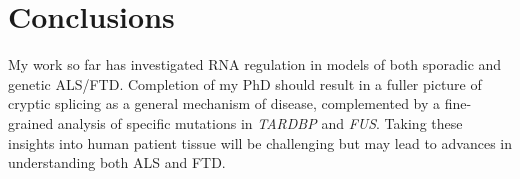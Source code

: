 \section{Conclusions}
My work so far has investigated RNA regulation in models of both sporadic and genetic ALS/FTD. Completion of my PhD should result in a fuller picture of cryptic splicing as a general mechanism of disease, complemented by a fine-grained analysis of specific mutations in \textit{TARDBP} and \textit{FUS}. Taking these insights into human patient tissue will be challenging but may lead to advances in understanding both ALS and FTD. 

